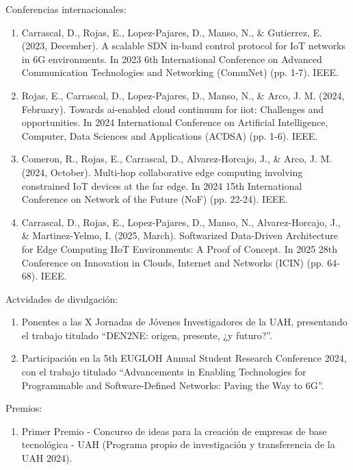 Conferencias internacionales:

\begin{enumerate}
    \item Carrascal, D., Rojas, E., Lopez-Pajares, D., Manso, N., \& Gutierrez, E. (2023, December). A scalable SDN in-band control protocol for IoT networks in 6G environments. In 2023 6th International Conference on Advanced Communication Technologies and Networking (CommNet) (pp. 1-7). IEEE.
    
    \item Rojas, E., Carrascal, D., Lopez-Pajares, D., Manso, N., \& Arco, J. M. (2024, February). Towards ai-enabled cloud continuum for iiot: Challenges and opportunities. In 2024 International Conference on Artificial Intelligence, Computer, Data Sciences and Applications (ACDSA) (pp. 1-6). IEEE.
    
    \item Comeron, R., Rojas, E., Carrascal, D., Alvarez-Horcajo, J., \& Arco, J. M. (2024, October). Multi-hop collaborative edge computing involving constrained IoT devices at the far edge. In 2024 15th International Conference on Network of the Future (NoF) (pp. 22-24). IEEE.
 
    \item Carrascal, D., Rojas, E., Lopez-Pajares, D., Manso, N., Alvarez-Horcajo, J., \& Martinez-Yelmo, I. (2025, March). Softwarized Data-Driven Architecture for Edge Computing IIoT Environments: A Proof of Concept. In 2025 28th Conference on Innovation in Clouds, Internet and Networks (ICIN) (pp. 64-68). IEEE.
    
\end{enumerate}

Actvidades de divulgación:

\begin{enumerate}
    \item Ponentes a las X Jornadas de Jóvenes Investigadores de la UAH, presentando el trabajo titulado ``DEN2NE: origen, presente, ¿y futuro?''.
    
    \item Participación en la 5th EUGLOH Annual Student Research Conference 2024, con el trabajo titulado ``Advancements in Enabling Technologies for Programmable and Software-Defined Networks: Paving the Way to 6G''.
\end{enumerate}

Premios:

\begin{enumerate}
    \item Primer Premio - Concurso de ideas para la creación de empresas de base tecnológica - UAH (Programa propio de investigación y transferencia de la UAH 2024).
\end{enumerate}

